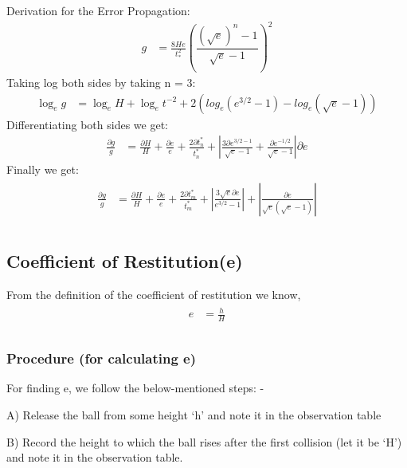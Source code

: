 \documentclass[11pt]{scrartcl} %
\begin{document}
Derivation for the Error Propagation:
\begin{align} 
		g &= \frac{8He}{t_{*}^{2}}\left(\dfrac{(\sqrt{e})^n-1}{\sqrt{e}-1}\right)^2 \nonumber
\end{align}
    Taking log both sides by taking n = 3:
\begin{align} 
            \log_e g &= \log_e H + \log_e t^{-2} + 2(log_e ({e^{3/2}-1}) - log_e ({\sqrt{e}-1})) \nonumber
\end{align}
    Differentiating both sides we get:
\begin{align} 
        \frac{\partial{g}}{g} &= \frac{\partial{H}}{H} + \frac{\partial{e}}{e} + \frac{2\partial{t_n^*}}{t_n^*} + \left|\frac{3\partial{e^{3/2-1}}}{\sqrt{e}-1} + \frac{\partial{e^{-1/2}}}{\sqrt{e}-1}\right|\partial{e} \nonumber
\end{align}
   Finally we get:
\begin{align} 
	\begin{split}
		\frac{\partial{g}}{g} &= \frac{\partial{H}}{H} + \frac{\partial{e}}{e}+\frac{2\partial{t_m^*}}{t_m^*}+\left|\frac{3\sqrt{e}\partial{e}}{e^{3/2}-1}\right|+\left|\frac{\partial{e}}{\sqrt{e}(\sqrt{e}-1)}\right|\\
	\end{split}					
\end{align}

\subsection{Coefficient of Restitution(e)}
From the definition of the coefficient of restitution we know, 
\begin{align} 
	\begin{split}
		e &= \frac{h}{H}\\
	\end{split}					
\end{align}

\subsubsection{Procedure (for calculating e)}
For finding e, we follow the below-mentioned steps: - \par

A) Release the ball from some height ‘h’ and note it in the observation table \par

B) Record the height to which the ball rises after the first collision (let it be ‘H’) and note it in the observation table. \par
\end{document}
